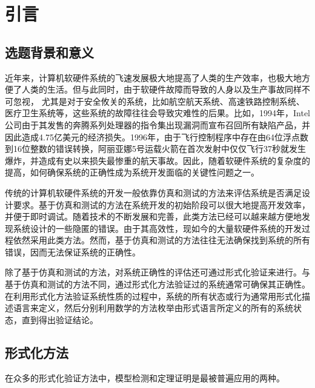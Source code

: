 \chapter{引言}\label{chapt:intro}
\section{选题背景和意义}
近年来，计算机软硬件系统的飞速发展极大地提高了人类的生产效率，也极大地方便了人类的生活。但与此同时，由于软硬件故障而导致的人身以及生产事故同样不可忽视，
尤其是对于安全攸关的系统，比如航空航天系统、高速铁路控制系统、医疗卫生系统等，这些系统的故障往往会导致灾难性的后果。比如，1994年，Intel公司由于其发售的奔腾系列处理器的指令集出现漏洞而宣布召回所有缺陷产品，并因此造成4.75亿美元的经济损失。1996年，由于飞行控制程序中存在由64位浮点数到16位整数的错误转换，阿丽亚娜5号运载火箭在首次发射中仅仅飞行37秒就发生爆炸，并造成有史以来损失最惨重的航天事故。因此，随着软硬件系统的复杂度的提高，如何确保系统的正确性成为系统开发面临的关键性问题之一。

传统的计算机软硬件系统的开发一般依靠仿真和测试的方法来评估系统是否满足设计要求。基于仿真和测试的方法在系统开发的初始阶段可以很大地提高开发效率，并便于即时调试。随着技术的不断发展和完善，此类方法已经可以越来越方便地发现系统设计的一些隐匿的错误。由于其高效性，现如今的大量软硬件系统的开发过程依然采用此类方法。然而，基于仿真和测试的方法往往无法确保找到系统的所有错误，因而无法保证系统的正确性。

除了基于仿真和测试的方法，对系统正确性的评估还可通过形式化验证来进行。与基于仿真和测试的方法不同，通过形式化方法验证过的系统通常可确保其正确性。在利用形式化方法验证系统性质的过程中，系统的所有状态或行为通常用形式化描述语言来定义，然后分别利用数学的方法枚举由形式语言所定义的所有的系统状态，直到得出验证结论。
\section{形式化方法}
在众多的形式化验证方法中，模型检测和定理证明是最被普遍应用的两种。

